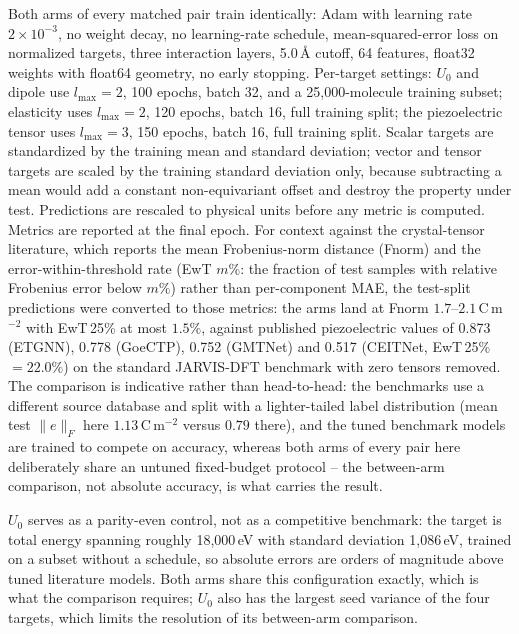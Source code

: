 Both arms of every matched pair train identically: Adam\cite{kingma2015adam} with learning rate $2\times10^{-3}$, no weight decay, no learning-rate schedule, mean-squared-error loss on normalized targets, three interaction layers, 5.0\,\AA{} cutoff, 64 features, float32 weights with float64 geometry, no early stopping. Per-target settings: $U_0$ and dipole use $l_{\max}=2$, 100 epochs, batch 32, and a 25,000-molecule training subset; elasticity uses $l_{\max}=2$, 120 epochs, batch 16, full training split; the piezoelectric tensor uses $l_{\max}=3$, 150 epochs, batch 16, full training split. Scalar targets are standardized by the training mean and standard deviation; vector and tensor targets are scaled by the training standard deviation only, because subtracting a mean would add a constant non-equivariant offset and destroy the property under test. Predictions are rescaled to physical units before any metric is computed. Metrics are reported at the final epoch. For context against the crystal-tensor literature, which reports the mean Frobenius-norm distance (Fnorm) and the error-within-threshold rate (EwT $m\%$: the fraction of test samples with relative Frobenius error below $m\%$) rather than per-component MAE, the test-split predictions were converted to those metrics: the arms land at Fnorm $1.7$--$2.1$\,C\,m$^{-2}$ with EwT\,25\% at most $1.5\%$, against published piezoelectric values of 0.873 (ETGNN), 0.778 (GoeCTP), 0.752 (GMTNet) and 0.517 (CEITNet, EwT\,25\% $= 22.0\%$) on the standard JARVIS-DFT benchmark with zero tensors removed\cite{goectp2024,ceitnet2026}. The comparison is indicative rather than head-to-head: the benchmarks use a different source database and split with a lighter-tailed label distribution (mean test $\lVert e \rVert_F$ here $1.13$\,C\,m$^{-2}$ versus $0.79$ there), and the tuned benchmark models are trained to compete on accuracy, whereas both arms of every pair here deliberately share an untuned fixed-budget protocol -- the between-arm comparison, not absolute accuracy, is what carries the result.

$U_0$ serves as a parity-even control, not as a competitive benchmark: the target is total energy spanning roughly 18,000\,eV with standard deviation 1,086\,eV, trained on a subset without a schedule, so absolute errors are orders of magnitude above tuned literature models. Both arms share this configuration exactly, which is what the comparison requires; $U_0$ also has the largest seed variance of the four targets, which limits the resolution of its between-arm comparison.

